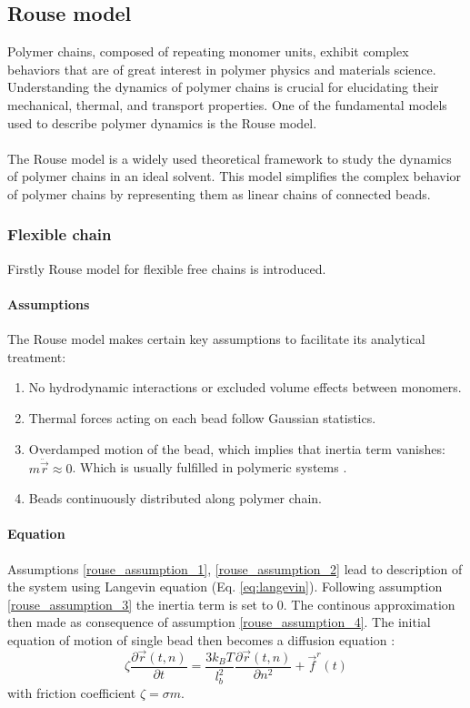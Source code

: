 \documentclass[
    paper=A4,pagesize=automedia,fontsize=12pt,
    BCOR=15mm,DIV=22,
    twoside,headinclude,footinclude=false,
    fleqn,             %
    bibliography=totocnumbered,          %
    listof=totoc,                %
    listof=flat,                 %
    cleardoublepage=empty      %
    numbers=endperiod
]{scrartcl}
\begin{document}
\subsection{Rouse model}
Polymer chains, composed of repeating monomer units, exhibit complex 
behaviors that are of great interest in polymer physics and materials science. 
Understanding the dynamics of polymer chains is crucial for elucidating their 
mechanical, thermal, and transport properties. One of the fundamental 
models used to describe polymer dynamics is the Rouse model.
\\
\\
The Rouse model is a widely used theoretical framework to study the dynamics 
of polymer chains in an ideal solvent. This model simplifies the complex 
behavior of polymer chains by representing them as linear chains of connected beads.

\subsubsection{Flexible chain}
Firstly Rouse model for flexible free chains is introduced.
\paragraph{Assumptions}
The Rouse model makes certain key assumptions to facilitate its analytical treatment:
\begin{enumerate}
    \item \label{rouse_assumption_1} No hydrodynamic interactions or excluded volume effects between monomers.
    \item \label{rouse_assumption_2} Thermal forces acting on each bead follow Gaussian statistics.
    \item \label{rouse_assumption_3} Overdamped motion of the bead, which implies that inertia term vanishes: $m \ddot{\vec{r}} \approx 0$.
    Which is usually fulfilled in polymeric systems \cite{Doi_Intro_PP:2005}.
    \item \label{rouse_assumption_4} Beads continuously distributed along polymer chain.
\end{enumerate}

\paragraph{Equation}
Assumptions \ref{rouse_assumption_1}, \ref{rouse_assumption_2} lead to description of the
system using Langevin equation (Eq. \ref{eq:langevin}). Following assumption \ref{rouse_assumption_3} 
the inertia term is set to 0. The continous approximation then made as consequence of assumption \ref{rouse_assumption_4}.
The initial equation of motion of single bead then becomes a diffusion equation \cite{Rub_Colby_PolyPhy:2005}:
\begin{equation}
    \label{eq:diffusion}
    \zeta \frac{\partial \vec{r}(t,n)}{\partial t} = \frac{3 k_B T}{l_b^2} \frac{\partial \vec{r}(t,n)}{\partial n^2} + \vec{f}^r(t)
\end{equation}
with friction coefficient $\zeta = \sigma m$.
\end{document}
